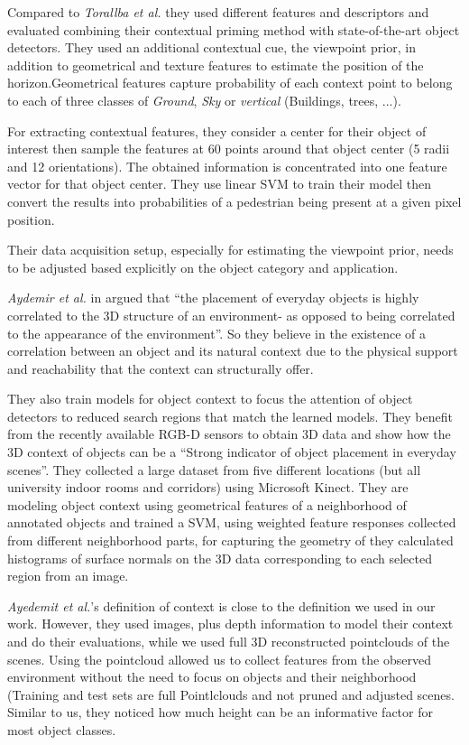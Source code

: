      Compared to \textit{Torallba et al.} they used different features and descriptors and evaluated combining their contextual priming method with state-of-the-art object detectors. They used an additional contextual cue, the viewpoint prior, in addition to geometrical and texture features to estimate the position of the horizon.Geometrical features capture probability of each context point to belong to each of three classes of \textit{Ground}, \textit{Sky} or \textit{vertical} (Buildings, trees, ...). 
     
     For extracting contextual features, they consider a center for their object of interest then sample the features at 60 points around that object center (5 radii and 12 orientations). The obtained information is concentrated into one feature vector for that object center. They use linear SVM to train their model then convert the results into probabilities of a pedestrian being present at a given pixel position. 
     
     Their data acquisition setup, especially for estimating the viewpoint prior, needs to be adjusted based explicitly on the object category and application. 
     
     
     \textit{Aydemir et al.} in  \cite{aydemir2012_3Dcontext} argued that ``the placement of everyday objects is highly correlated to the 3D structure of an environment- as opposed to being correlated to the appearance of the environment''. So they believe in the existence of a correlation between an object and its natural context due to the physical support and reachability that the context can structurally offer. 
     
     They also train models for object context to focus the attention of object detectors to reduced search regions that match the learned models. They benefit from the recently available RGB-D sensors to obtain 3D data and show how the 3D context of objects can be a ``Strong indicator of object placement in everyday scenes''. They collected a large dataset from five different locations (but all university indoor rooms and corridors) using Microsoft Kinect. They are modeling object context using geometrical features of a neighborhood of annotated objects and trained a SVM, using weighted feature responses collected from different neighborhood parts, for capturing the geometry of they calculated histograms of surface normals on the 3D data corresponding to each selected region from an image.
     
     \textit{Ayedemit et al.}'s definition of context is close to the definition we used in our work. However, they used images, plus depth information to model their context and do their evaluations, while we used full 3D reconstructed pointclouds of the scenes. Using the pointcloud allowed us to collect features from the observed environment without the need to focus on objects and their neighborhood (Training and test sets are full Pointlclouds and not pruned and adjusted scenes. Similar to us, they noticed how much height can be an informative factor for most object classes. 
     
